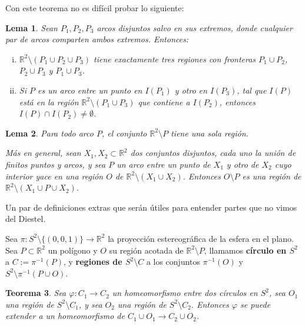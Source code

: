 \documentclass[12pt]{report}
\theoremstyle{plain}
\newtheorem{theorem}{Teorema}[section]
\newtheorem{lemma}[theorem]{Lema}
\theoremstyle{definition}
\newcommand{\reals}{\mathbb{R}}
\begin{document}
Con este teorema no es difícil probar lo siguiente:
\begin{lemma}\label{lema:tres arcos disjuntos forman 3 componentes}
Sean $P_1, P_2, P_3$ arcos disjuntos salvo en sus extremos, donde cualquier par de arcos comparten ambos extremos. Entonces:
\begin{enumerate}[(i)]
\item $\reals ^2 \setminus (P_1 \cup P_2 \cup P_3)$ tiene exactamente tres regiones con fronteras $P_1 \cup P_2$, $P_2 \cup P_3$ y $P_1 \cup P_3$.
\item Si $P$ es un arco entre un punto en $I (P_1)$ y otro en $I(P_3)$, tal que $I(P)$ está en la región $\reals^2 \setminus (P_1 \cup P_3)$ que contiene a $I(P_2)$, entonces $I(P) \cap I(P_2) \neq \emptyset$.
\end{enumerate}
\end{lemma}


\begin{lemma}\label{lema:arco tiene una sola cara}
Para todo arco $P$, el conjunto $\reals^2 \setminus P$ tiene una sola región.

Más en general, sean $X_1,X_2 \subset \reals^2$ dos conjuntos disjuntos, cada uno la unión de finitos puntos y arcos, y sea $P$ un arco entre un punto de $X_1$ y otro de $X_2$ cuyo interior yace en una región $O$ de $\reals^2 \setminus (X_1 \cup X_2)$. Entonces $O\setminus P$ es una región de $\reals^2 \setminus (X_1 \cup P \cup X_2)$.
\end{lemma}



\bigskip

Un par de definiciones extras que serán útiles para entender partes que no vimos del Diestel.

Sea $\pi : S^2 \setminus \{(0,0,1)\} \rightarrow \reals^2$ la proyección estereográfica de la esfera en el plano. Sea $P \subset \reals^2$ un polígono y $O$ su región acotada de $\reals^2 \setminus P$, llamamos \textbf{círculo en $S^2$} a $C := \pi^{-1}(P)$, y \textbf{regiones de $S^2 \setminus C$} a los conjuntos $\pi^{-1} (O)$ y $S^2 \setminus \pi^{-1} ( P \cup O)$.

\begin{theorem}
Sea $\varphi : C_1 \rightarrow C_2$ un homeomorfismo entre dos círculos en $S^2$, sea $O_1$ una región de $S^2 \setminus C_1$, y sea $O_2$ una región de $S^2 \setminus C_2$. Entonces $\varphi$ se puede extender a un homeomorfismo de $C_1 \cup O_1 \rightarrow C_2 \cup O_2$.
\end{theorem}
\end{document}

